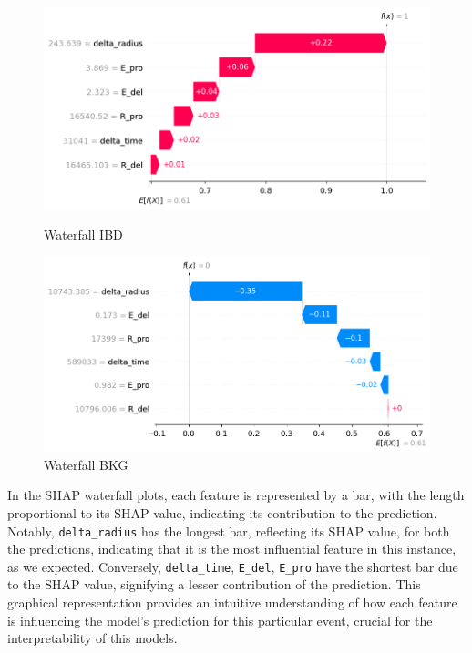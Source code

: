 \begin{figure}[h!]
	\centering
	\begin{minipage}{0.5\textwidth}
		\centering
		\includegraphics[width=\linewidth]{Images/Shap/waterfall_IBD}
		\caption{Waterfall IBD}
		\label{fig:waterfall_IBD}
	\end{minipage}%
	\begin{minipage}{0.5\textwidth}
		\centering
		\includegraphics[width=\linewidth]{Images/Shap/waterfall_BKG}
		\caption{Waterfall BKG}
		\label{fig:waterfall_BKG}
	\end{minipage}
\end{figure}

In the SHAP waterfall plots, each feature is represented by a bar, with the length proportional to its SHAP value, indicating its contribution to the prediction. Notably, \texttt{delta\_radius} has the longest bar, reflecting its SHAP value, for both the predictions, indicating that it is the most influential feature in this instance, as we expected. Conversely, \texttt{delta\_time}, \texttt{E\_del}, \texttt{E\_pro} have the shortest bar due to the SHAP value, signifying a lesser contribution of the prediction. This graphical representation provides an intuitive understanding of how each feature is influencing the model's prediction for this particular event, crucial for the interpretability of this models.\\
\newline

